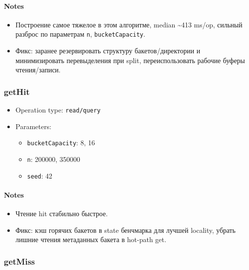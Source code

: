 \documentclass[
  10pt,
]{article}
\providecommand{\tightlist}{%
  \setlength{\itemsep}{0pt}\setlength{\parskip}{0pt}}
\begin{document}
\paragraph{Notes}\label{notes}

\begin{itemize}
\tightlist
\item
  Построение самое тяжелое в этом алгоритме, median \textasciitilde413
  ms/op, сильный разброс по параметрам \texttt{n},
  \texttt{bucketCapacity}.
\item
  Фикс: заранее резервировать структуру бакетов/директории и
  минимизировать перевыделения при split, переиспользовать рабочие
  буферы чтения/записи.
\end{itemize}

\subsubsection{getHit}\label{gethit}

\begin{itemize}
\tightlist
\item
  Operation type: \texttt{read/query}
\item
  Parameters:

  \begin{itemize}
  \tightlist
  \item
    \texttt{bucketCapacity}: 8, 16
  \item
    \texttt{n}: 200000, 350000
  \item
    \texttt{seed}: 42
  \end{itemize}
\end{itemize}

\paragraph{Notes}\label{notes-1}

\begin{itemize}
\tightlist
\item
  Чтение hit стабильно быстрое.
\item
  Фикс: кэш горячих бакетов в state бенчмарка для лучшей locality,
  убрать лишние чтения метаданных бакета в hot-path get.
\end{itemize}

\subsubsection{getMiss}\label{getmiss}
\end{document}
